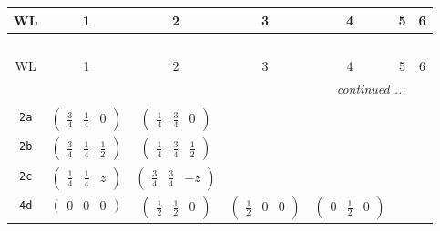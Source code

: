 \documentclass[fleqn,9pt,landscape]{jsarticle}
\begin{document}
\begin{center}
\renewcommand{\arraystretch}{1.2}
\begin{longtable}{ccccccc}
 \hline \hline
WL & 1 & 2 & 3 & 4 & 5 & 6 \\ \hline \endfirsthead

\multicolumn{6}{l}{\tablename\ \thetable{}} \\
 \hline \hline
WL & 1 & 2 & 3 & 4 & 5 & 6 \\ \hline \endhead

 \hline \hline
\multicolumn{6}{r}{\footnotesize\it continued ...} \\ \endfoot

 \hline \hline
\multicolumn{6}{r}{} \\ \endlastfoot

{\tt 2a} & $ \begin{pmatrix} \frac{3}{4} & \frac{1}{4} & 0 \end{pmatrix} $ & $ \begin{pmatrix} \frac{1}{4} & \frac{3}{4} & 0 \end{pmatrix} $ & $  $ & $  $ & $  $ & $  $ \\ \hline
{\tt 2b} & $ \begin{pmatrix} \frac{3}{4} & \frac{1}{4} & \frac{1}{2} \end{pmatrix} $ & $ \begin{pmatrix} \frac{1}{4} & \frac{3}{4} & \frac{1}{2} \end{pmatrix} $ & $  $ & $  $ & $  $ & $  $ \\ \hline
{\tt 2c} & $ \begin{pmatrix} \frac{1}{4} & \frac{1}{4} & z \end{pmatrix} $ & $ \begin{pmatrix} \frac{3}{4} & \frac{3}{4} & - z \end{pmatrix} $ & $  $ & $  $ & $  $ & $  $ \\ \hline
{\tt 4d} & $ \begin{pmatrix} 0 & 0 & 0 \end{pmatrix} $ & $ \begin{pmatrix} \frac{1}{2} & \frac{1}{2} & 0 \end{pmatrix} $ & $ \begin{pmatrix} \frac{1}{2} & 0 & 0 \end{pmatrix} $ & $ \begin{pmatrix} 0 & \frac{1}{2} & 0 \end{pmatrix} $ & $  $ & $  $ \\ \hline

\end{longtable}
\end{center}
\end{document}
